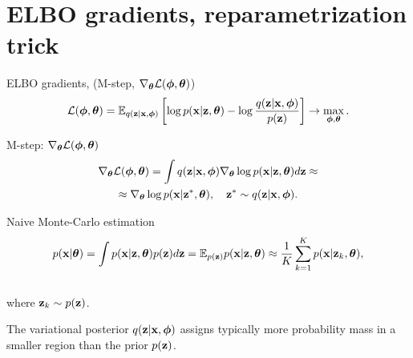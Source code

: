 \section{ELBO gradients, reparametrization trick}
\begin{frame}{ELBO gradients, (M-step, $\nabla_{\boldsymbol{\theta}} \mathcal{L}(\boldsymbol{\phi}, \boldsymbol{\theta})$)}
	\[
		 \mathcal{L} (\boldsymbol{\phi}, \boldsymbol{\theta})  = \mathbb{E}_{q(\mathbf{z} | \mathbf{x}, \boldsymbol{\phi})} \left[\log p(\mathbf{x} | \mathbf{z}, \boldsymbol{\theta}) - \log \frac{q(\mathbf{z} | \mathbf{x}, \boldsymbol{\phi})}{p(\mathbf{z})} \right] \rightarrow \max_{\boldsymbol{\phi}, \boldsymbol{\theta}}.
	\]	
	\vspace{-0.5cm}
	\begin{block}{M-step: $\nabla_{\boldsymbol{\theta}} \mathcal{L}(\boldsymbol{\phi}, \boldsymbol{\theta})$}
		\vspace{-0.7cm}
		\begin{multline*}
			\nabla_{\boldsymbol{\theta}} \mathcal{L} (\boldsymbol{\phi}, \boldsymbol{\theta})
			= \int q(\mathbf{z}|\mathbf{x}, \boldsymbol{\phi}) \nabla_{\boldsymbol{\theta}}\log p(\mathbf{x}|\mathbf{z}, \boldsymbol{\theta}) d \mathbf{z} \approx  \\
			\approx \nabla_{\boldsymbol{\theta}}\log p(\mathbf{x}|\mathbf{z}^*, \boldsymbol{\theta}), \quad \mathbf{z}^* \sim q(\mathbf{z}|\mathbf{x}, \boldsymbol{\phi}).
		\end{multline*}
		\vspace{-0.9cm}
	\end{block}
	\begin{block}{Naive Monte-Carlo estimation}
		\vspace{-0.7cm}
		\[
		p(\mathbf{x} | \boldsymbol{\theta}) = \int p(\mathbf{x} | \mathbf{z}, \boldsymbol{\theta}) p(\mathbf{z}) d\mathbf{z} = \mathbb{E}_{p(\mathbf{z})} p(\mathbf{x} | \mathbf{z}, \boldsymbol{\theta}) \approx \frac{1}{K} \sum_{k=1}^{K} p(\mathbf{x} | \mathbf{z}_k, \boldsymbol{\theta}),
		\]
		\vspace{-0.5cm} \\
		where $\mathbf{z}_k \sim p(\mathbf{z})$. 
	\end{block}
	The variational posterior $q(\mathbf{z}|\mathbf{x}, \boldsymbol{\phi})$ assigns typically more probability mass in a smaller region than the prior $p(\mathbf{z})$. 
\end{frame}
